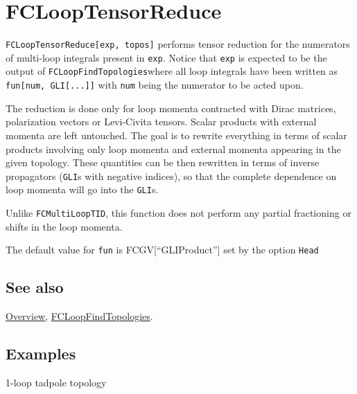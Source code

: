 \documentclass[../FeynCalcManual.tex]{subfiles}
\begin{document}
\hypertarget{fclooptensorreduce}{
\section{FCLoopTensorReduce}\label{fclooptensorreduce}}

\texttt{FCLoopTensorReduce[\allowbreak{}exp,\ \allowbreak{}topos]}
performs tensor reduction for the numerators of multi-loop integrals
present in \texttt{exp}. Notice that \texttt{exp} is expected to be the
output of \texttt{FCLoopFindTopologies}where all loop integrals have
been written as
\texttt{fun[\allowbreak{}num,\ \allowbreak{}GLI[\allowbreak{}...]]} with
\texttt{num} being the numerator to be acted upon.

The reduction is done only for loop momenta contracted with Dirac
matrices, polarization vectors or Levi-Civita tensors. Scalar products
with external momenta are left untouched. The goal is to rewrite
everything in terms of scalar products involving only loop momenta and
external momenta appearing in the given topology. These quantities can
be then rewritten in terms of inverse propagators (\texttt{GLI}s with
negative indices), so that the complete dependence on loop momenta will
go into the \texttt{GLI}s.

Unlike \texttt{FCMultiLoopTID}, this function does not perform any
partial fractioning or shifts in the loop momenta.

The default value for \texttt{fun} is FCGV{[}``GLIProduct''{]} set by
the option \texttt{Head}

\subsection{See also}

\hyperlink{toc}{Overview},
\hyperlink{fcloopfindtopologies}{FCLoopFindTopologies}.

\subsection{Examples}

1-loop tadpole topology

\begin{Shaded}
\begin{Highlighting}[]
\ExtensionTok{=}\OperatorTok{[}\OperatorTok{,} \OperatorTok{\{}\OperatorTok{[\{}\OperatorTok{,} \SpecialCharTok{\^{}}\OperatorTok{\}]\},} \OperatorTok{\{}\OperatorTok{\},} \OperatorTok{\{\},} \OperatorTok{\{\},} \OperatorTok{\{\}]}
\end{Highlighting}
\end{Shaded}
\end{document}
